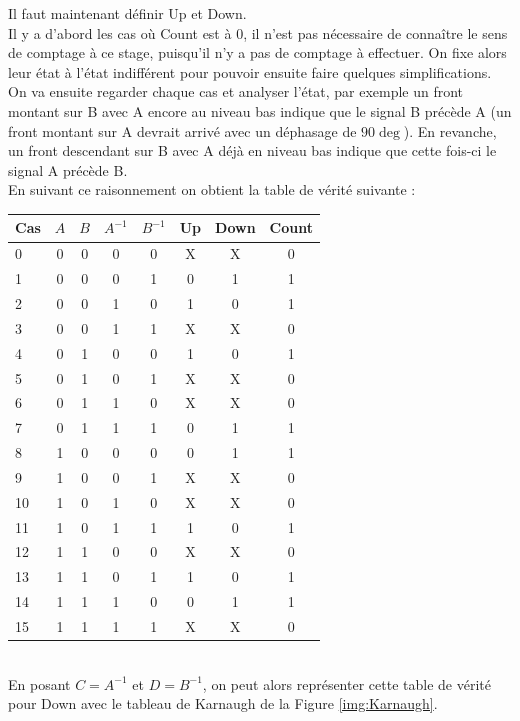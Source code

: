 	Il faut maintenant définir Up et Down.\\
	Il y a d'abord les cas où Count est à 0, il n'est pas nécessaire de conna\^itre le sens de comptage à ce stage, puisqu'il n'y a pas de comptage à effectuer. On fixe alors leur état à l'état indifférent pour pouvoir ensuite faire quelques simplifications.\\
	On va ensuite regarder chaque cas et analyser l'état, par exemple un front montant sur B avec A encore au niveau bas indique que le signal B précède A (un front montant sur A devrait arrivé avec un déphasage de $90\deg$). En revanche, un front descendant sur B avec A déjà en niveau bas indique que cette fois-ci le signal A précède B.\\
	En suivant ce raisonnement on obtient la table de vérité suivante : \\
	
	\begin{tabular}{|l|||c|c|c|c|||c|c||c|}
	  \hline
	  Cas & $A$ & $B$ & $A^{-1}$ & $B^{-1}$ & Up & Down & Count \\
	  \hline
	  \hline
	  0 &0&0&0&0&X&X&0 \\
	  \hline
	  1 &0&0&0&1&0&1&1 \\
	  \hline
	  2 &0&0&1&0&1&0&1 \\
	  \hline
	  3 &0&0&1&1&X&X&0 \\
	  \hline
	  4 &0&1&0&0&1&0&1 \\
	  \hline
	  5 &0&1&0&1&X&X&0 \\
	  \hline
	  6 &0&1&1&0&X&X&0 \\
	  \hline
	  7 &0&1&1&1&0&1&1 \\
	  \hline
	  8 &1&0&0&0&0&1&1 \\
	  \hline
	  9 &1&0&0&1&X&X&0 \\
	  \hline
	  10 &1&0&1&0&X&X&0 \\
	  \hline
	  11 &1&0&1&1&1&0&1 \\
	  \hline
	  12 &1&1&0&0&X&X&0 \\
	  \hline
	  13 &1&1&0&1&1&0&1 \\
	  \hline
	  14 &1&1&1&0&0&1&1 \\
	  \hline
	  15 &1&1&1&1&X&X&0 \\
	  \hline
	\end{tabular}~\\
	
	En posant $C = A^{-1}$ et $D = B^{-1}$, on peut alors représenter cette table de vérité pour Down avec le tableau de Karnaugh de la Figure \ref{img:Karnaugh}.\\
		
